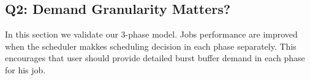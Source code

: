 \subsection{Q2: Demand Granularity Matters?}


In this section we validate our 3-phase model.
Jobs performance are improved when the scheduler makkes scheduling decision in each phase separately.
This encourages that user should provide detailed burst buffer demand in each phase for his job.


